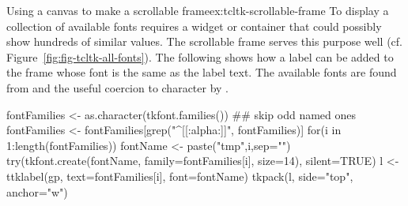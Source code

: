 \begin{example}{Using a canvas to make a scrollable frame}{ex:tcltk-scrollable-frame}
To display a collection of available fonts requires a widget or
container that could possibly show hundreds of similar values. The
scrollable frame serves this purpose well
(cf. Figure~\ref{fig:fig-tcltk-all-fonts}).  The following shows how a
label can be added to the frame whose font is the same as the label
text. The available fonts are found from 
and the useful coercion to character by .
\begin{Schunk}
\begin{Sinput}
 fontFamilies <- as.character(tkfont.families())
 ## skip odd named ones
 fontFamilies <- fontFamilies[grep("^[[:alpha:]]", fontFamilies)] 
 for(i in 1:length(fontFamilies)) {
   fontName <- paste("tmp",i,sep="")
   try(tkfont.create(fontName, family=fontFamilies[i], size=14), 
       silent=TRUE)
   l <- ttklabel(gp, text=fontFamilies[i], font=fontName)
   tkpack(l, side="top", anchor="w")
 }
\end{Sinput}
\end{Schunk}

\end{example}

